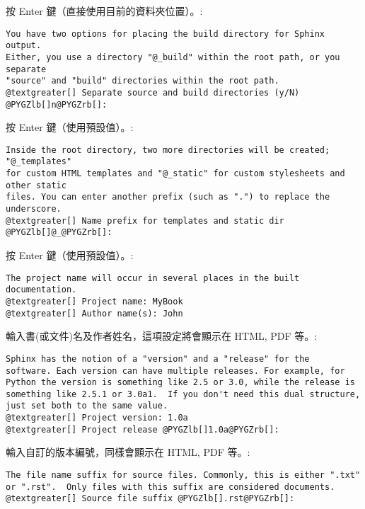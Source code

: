 \documentclass[a4paper,12pt,english]{sphinxmanual}
\begin{document}
按 Enter 鍵（直接使用目前的資料夾位置）。:

\begin{Verbatim}[commandchars=@\[\]]
You have two options for placing the build directory for Sphinx output.
Either, you use a directory "@_build" within the root path, or you separate
"source" and "build" directories within the root path.
@textgreater[] Separate source and build directories (y/N) @PYGZlb[]n@PYGZrb[]:
\end{Verbatim}

按 Enter 鍵（使用預設值）。:

\begin{Verbatim}[commandchars=@\[\]]
Inside the root directory, two more directories will be created; "@_templates"
for custom HTML templates and "@_static" for custom stylesheets and other static
files. You can enter another prefix (such as ".") to replace the underscore.
@textgreater[] Name prefix for templates and static dir @PYGZlb[]@_@PYGZrb[]:
\end{Verbatim}

按 Enter 鍵（使用預設值）。:

\begin{Verbatim}[commandchars=@\[\]]
The project name will occur in several places in the built documentation.
@textgreater[] Project name: MyBook
@textgreater[] Author name(s): John
\end{Verbatim}

輸入書(或文件)名及作者姓名，這項設定將會顯示在 HTML, PDF 等。:

\begin{Verbatim}[commandchars=@\[\]]
Sphinx has the notion of a "version" and a "release" for the
software. Each version can have multiple releases. For example, for
Python the version is something like 2.5 or 3.0, while the release is
something like 2.5.1 or 3.0a1.  If you don't need this dual structure,
just set both to the same value.
@textgreater[] Project version: 1.0a
@textgreater[] Project release @PYGZlb[]1.0a@PYGZrb[]:
\end{Verbatim}

輸入自訂的版本編號，同樣會顯示在 HTML, PDF 等。:

\begin{Verbatim}[commandchars=@\[\]]
The file name suffix for source files. Commonly, this is either ".txt"
or ".rst".  Only files with this suffix are considered documents.
@textgreater[] Source file suffix @PYGZlb[].rst@PYGZrb[]:
\end{Verbatim}
\end{document}

